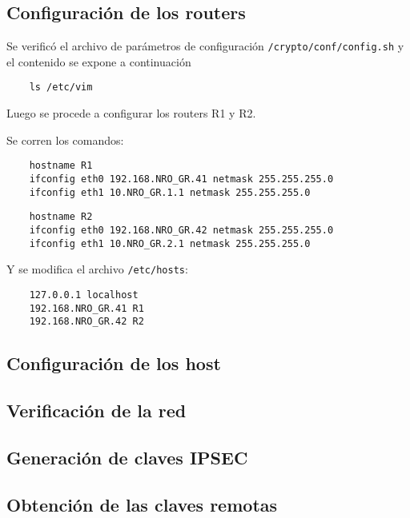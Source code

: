 
\subsection{Configuración de los routers}

Se verificó el archivo de parámetros de configuración \texttt{/crypto/conf/config.sh} y el contenido se expone a continuación

\lstset{language=bash}
\begin{lstlisting}
	ls /etc/vim
\end{lstlisting}

Luego se procede a configurar los routers \textsc{R1} y \textsc{R2}.

Se corren los comandos:

\begin{lstlisting}
	hostname R1
	ifconfig eth0 192.168.NRO_GR.41 netmask 255.255.255.0
	ifconfig eth1 10.NRO_GR.1.1 netmask 255.255.255.0
\end{lstlisting}

\begin{lstlisting}
	hostname R2
	ifconfig eth0 192.168.NRO_GR.42 netmask 255.255.255.0
	ifconfig eth1 10.NRO_GR.2.1 netmask 255.255.255.0
\end{lstlisting}

Y se modifica el archivo \texttt{/etc/hosts}:
\begin{lstlisting}
	127.0.0.1 localhost
	192.168.NRO_GR.41 R1
	192.168.NRO_GR.42 R2
\end{lstlisting}

\subsection{Configuración de los host}

\subsection{Verificación de la red}

\subsection{Generación de claves IPSEC}

\subsection{Obtención de las claves remotas}


